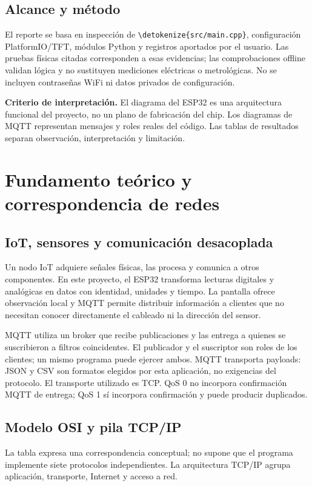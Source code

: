\documentclass[11pt,a4paper]{article}
\newcommand{\code}[1]{\expandafter\nolinkurl\expandafter{\detokenize{#1}}}
\newcommand{\note}[1]{\par\smallskip\noindent\colorbox{pale}{\parbox{\dimexpr\linewidth-14pt\relax}{\small\textbf{Criterio de interpretación.} #1}}\par\smallskip}
\newcommand{\nextsection}[1]{\clearpage\section{#1}}
\begin{document}
\subsection*{Alcance y método}
El reporte se basa en inspección de \code{src/main.cpp}, configuración PlatformIO/TFT, módulos Python y registros aportados por el usuario. Las pruebas físicas citadas corresponden a esas evidencias; las comprobaciones offline validan lógica y no sustituyen mediciones eléctricas o metrológicas. No se incluyen contraseñas WiFi ni datos privados de configuración.

\clearpage
\tableofcontents
\vspace{5mm}
\note{El diagrama del ESP32 es una arquitectura funcional del proyecto, no un plano de fabricación del chip. Los diagramas de MQTT representan mensajes y roles reales del código. Las tablas de resultados separan observación, interpretación y limitación.}

\nextsection{Fundamento teórico y correspondencia de redes}
\subsection{IoT, sensores y comunicación desacoplada}
Un nodo IoT adquiere señales físicas, las procesa y comunica a otros componentes. En este proyecto, el ESP32 transforma lecturas digitales y analógicas en datos con identidad, unidades y tiempo. La pantalla ofrece observación local y MQTT permite distribuir información a clientes que no necesitan conocer directamente el cableado ni la dirección del sensor.

MQTT utiliza un broker que recibe publicaciones y las entrega a quienes se suscribieron a filtros coincidentes. El publicador y el suscriptor son roles de los clientes; un mismo programa puede ejercer ambos. MQTT transporta payloads: JSON y CSV son formatos elegidos por esta aplicación, no exigencias del protocolo. El transporte utilizado es TCP. QoS 0 no incorpora confirmación MQTT de entrega; QoS 1 sí incorpora confirmación y puede producir duplicados.\cite{mqtt}

\subsection{Modelo OSI y pila TCP/IP}
La tabla expresa una correspondencia conceptual; no supone que el programa implemente siete protocolos independientes. La arquitectura TCP/IP agrupa aplicación, transporte, Internet y acceso a red.\cite{rfc1122}
\end{document}
